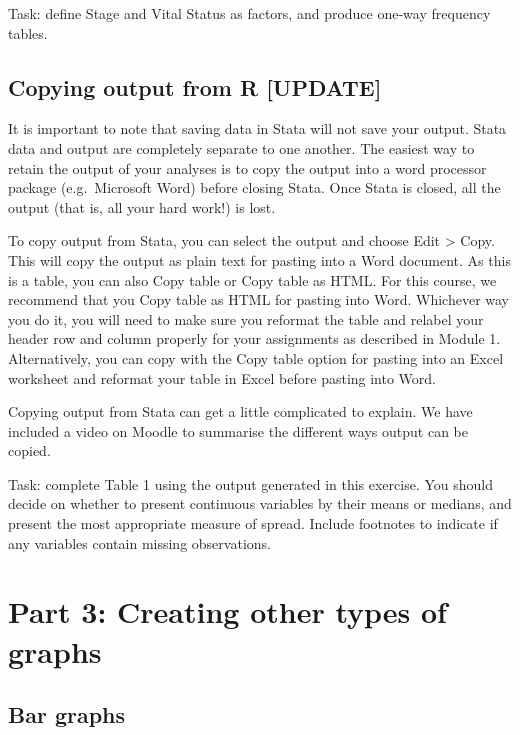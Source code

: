 \documentclass[
]{memoir}
\begin{document}
Task: define Stage and Vital Status as factors, and produce one-way frequency tables.

\hypertarget{copying-output-from-r-update}{%
\subsection{Copying output from R {[}UPDATE{]}}\label{copying-output-from-r-update}}

It is important to note that saving data in Stata will not save your output. Stata data and output are completely separate to one another. The easiest way to retain the output of your analyses is to copy the output into a word processor package (e.g.~Microsoft Word) before closing Stata. Once Stata is closed, all the output (that is, all your hard work!) is lost.

To copy output from Stata, you can select the output and choose Edit \textgreater{} Copy. This will copy the output as plain text for pasting into a Word document. As this is a table, you can also Copy table or Copy table as HTML. For this course, we recommend that you Copy table as HTML for pasting into Word. Whichever way you do it, you will need to make sure you reformat the table and relabel your header row and column properly for your assignments as described in Module 1. Alternatively, you can copy with the Copy table option for pasting into an Excel worksheet and reformat your table in Excel before pasting into Word.

Copying output from Stata can get a little complicated to explain. We have included a video on Moodle to summarise the different ways output can be copied.

Task: complete Table 1 using the output generated in this exercise. You should decide on whether to present continuous variables by their means or medians, and present the most appropriate measure of spread. Include footnotes to indicate if any variables contain missing observations.

\hypertarget{part-3-creating-other-types-of-graphs}{%
\section*{Part 3: Creating other types of graphs}\label{part-3-creating-other-types-of-graphs}}

\hypertarget{bar-graphs}{%
\subsection{Bar graphs}\label{bar-graphs}}
\end{document}
